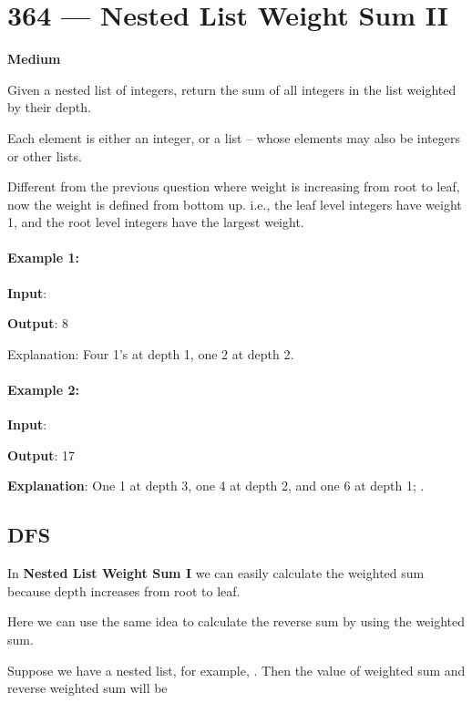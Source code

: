 \section{364 --- Nested List Weight Sum II}

\textbf{Medium}

Given a nested list of integers, return the sum of all integers in the list weighted by their depth.

Each element is either an integer, or a list -- whose elements may also be integers or other lists.

Different from the previous question where weight is increasing from root to leaf, now the weight is defined from bottom up. i.e., the leaf level integers have weight 1, and the root level integers have the largest weight.

\paragraph{Example 1:}

\begin{flushleft}
\textbf{Input}: \fcj{[[1,1],2,[1,1]]}

\textbf{Output}: 8 

Explanation: Four 1's at depth 1, one 2 at depth 2.
\end{flushleft}

\paragraph{Example 2:}

\begin{flushleft}
\textbf{Input}: 

\textbf{Output}: 17 

\textbf{Explanation}: One 1 at depth 3, one 4 at depth 2, and one 6 at depth 1; .
\end{flushleft}

\subsection{DFS}
In \textbf{Nested List Weight Sum I} we can easily calculate the weighted sum because depth increases from root to leaf.

Here we can use the same idea to calculate the reverse sum by using the weighted sum.

Suppose we have a nested list, for example, . Then the value of weighted sum and reverse weighted sum will be

